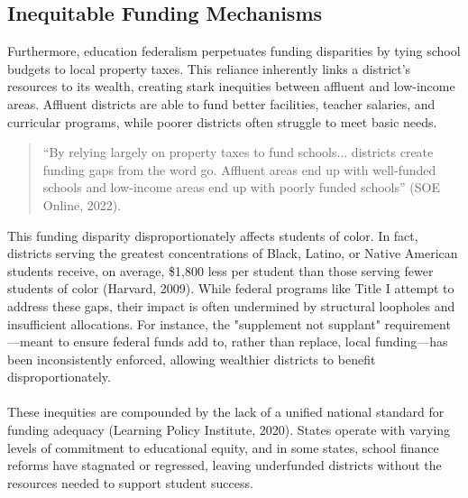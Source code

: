 \documentclass[11pt]{extarticle}
\begin{document}
\subsection{Inequitable Funding Mechanisms}
Furthermore, education federalism perpetuates funding disparities by tying school budgets to local property taxes. This reliance inherently links a district’s resources to its wealth, creating stark inequities between affluent and low-income areas. Affluent districts are able to fund better facilities, teacher salaries, and curricular programs, while poorer districts often struggle to meet basic needs.
\begin{quote}
  ``By relying largely on property taxes to fund schools... districts create funding gaps from the word go. Affluent areas end up with well-funded schools and low-income areas end up with poorly funded schools” (SOE Online, 2022).
\end{quote}
This funding disparity disproportionately affects students of color. In fact, districts serving the greatest concentrations of Black, Latino, or Native American students receive, on average, \$1,800 less per student than those serving fewer students of color (Harvard, 2009). While federal programs like Title I attempt to address these gaps, their impact is often undermined by structural loopholes and insufficient allocations. For instance, the "supplement not supplant" requirement—meant to ensure federal funds add to, rather than replace, local funding—has been inconsistently enforced, allowing wealthier districts to benefit disproportionately.\\
\\
These inequities are compounded by the lack of a unified national standard for funding adequacy (Learning Policy Institute, 2020). States operate with varying levels of commitment to educational equity, and in some states, school finance reforms have stagnated or regressed, leaving underfunded districts without the resources needed to support student success.
\end{document}
